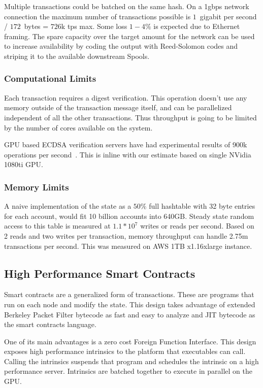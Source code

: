 \documentclass[12pt]{article}
\begin{document}
Multiple transactions could be batched on the same hash. On a 1gbps network connection the maximum number of transactions possible is $1$~gigabit per second / $172$~bytes = $726$k tps max. Some loss $1-4\%$ is expected due to Ethernet framing. The spare capacity over the target amount for the network can be used to increase availability by coding the output with Reed-Solomon codes and striping it to the available downstream Spools.
\subsubsection{Computational Limits}
Each transaction requires a digest verification. This operation doesn’t use any memory outside of the transaction message itself, and can be parallelized independent of all the other transactions. Thus throughput is going to be limited by the number of cores available on the system.

GPU based ECDSA verification servers have had experimental results of 900k operations per second~\cite{gpuecc}. This is inline with our estimate based on single NVidia 1080ti GPU. 
\subsubsection{Memory Limits}
A naive implementation of the state as a \(50\%\) full hashtable with 32 byte entries for each account, would fit 10 billion accounts into 640GB. Steady state random access to this table is measured at \(1.1 * 10^7\) writes or reads per second. Based on 2 reads and two writes per transaction, memory throughput can handle 2.75m transactions per second. This was measured on AWS 1TB x1.16xlarge instance.

\subsection{High Performance Smart Contracts}\label{sec:smartcontracts}

Smart contracts are a generalized form of transactions. These are programs that run on each node and modify the state. This design takes advantage of extended Berkeley Packet Filter bytecode as fast and easy to analyze and JIT bytecode as the smart contracts language.

One of its main advantages is a zero cost Foreign Function Interface. This design exposes high performance intrinsics to the platform that executables can call. Calling the intrinsics suspends that program and schedules the intrinsic on a high performance server. Intrinsics are batched together to execute in parallel on the GPU.
\end{document}
